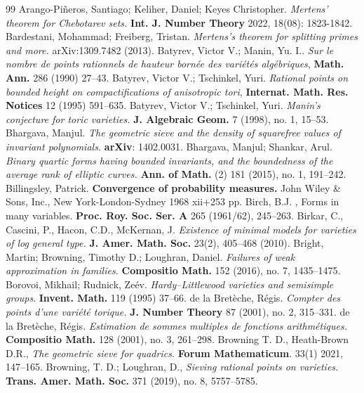 \begin{thebibliography}{99}
	 Arango-Piñeros, Santiago; Keliher, Daniel; Keyes Christopher. \emph{Mertens' theorem for Chebotarev sets.}  \textbf{Int. J. Number Theory} 2022, 18(08): 1823-1842.
	 Bardestani, Mohammad; Freiberg, Tristan. \emph{Mertens's theorem for splitting primes and more.} arXiv:1309.7482 (2013).
	 Batyrev, Victor V.; Manin, Yu. I.. \emph{Sur le nombre de points rationnels de hauteur born\'ee
	des vari\'et\'es alg\'ebriques}, \textbf{Math. Ann.} 286 (1990) 27--43.
	 Batyrev, Victor V.; Tschinkel, Yuri. \emph{Rational points on bounded height on compactifications of anisotropic tori}, \textbf{Internat. Math. Res. Notices} 12 (1995) 591--635.
	 Batyrev, Victor V.; Tschinkel, Yuri. \emph{Manin's conjecture for toric varieties.} \textbf{J. Algebraic Geom.} 7 (1998), no. 1, 15--53.
	  Bhargava, Manjul. \emph{The geometric sieve and the density of squarefree values of invariant polynomials.} \textbf{arXiv}: 1402.0031.
	 Bhargava, Manjul; Shankar, Arul. \emph{Binary quartic forms having bounded invariants, and the boundedness of the average rank of elliptic curves.} \textbf{Ann. of Math.} (2) 181 (2015), no. 1, 191--242.
	 Billingsley, Patrick. \textbf{Convergence of probability measures.} John Wiley \& Sons, Inc., New York-London-Sydney 1968 xii+253 pp.
	 Birch, B.J. , Forms in many variables. \textbf{Proc. Roy. Soc. Ser. A} 265 (1961/62), 245--263.
	 Birkar, C., Cascini, P., Hacon, C.D., McKernan, J. \emph{Existence of minimal models for varieties of log general type.} \textbf{J. Amer. Math. Soc.} 23(2), 405--468 (2010).
	 Bright, Martin; Browning, Timothy D.; Loughran, Daniel.
	\emph{Failures of weak approximation in families.} \textbf{Compositio Math.} 152 (2016), no. 7, 1435--1475.
	Borovoi, Mikhail; Rudnick, Zeév. \emph{Hardy--Littlewood varieties and semisimple groups}. \textbf{Invent. Math.} 119 (1995) 37--66.
	 de la Bretèche, Régis. \emph{Compter des points d'une variété torique.} \textbf{J. Number Theory} 87 (2001), no. 2, 315--331. 
	 de la Bretèche, Régis. \emph{Estimation de sommes multiples de fonctions arithmétiques.} \textbf{Compositio Math.} 128 (2001), no. 3, 261--298.
	 Browning T. D., Heath-Brown D.R., \emph{The geometric sieve for quadrics.} \textbf{Forum Mathematicum}. 33(1) 2021, 147--165.
	 Browning, T. D.; Loughran, D., \emph{Sieving rational points on varieties.} \textbf{Trans. Amer. Math. Soc.} 371 (2019), no. 8, 5757--5785.

\end{thebibliography}
